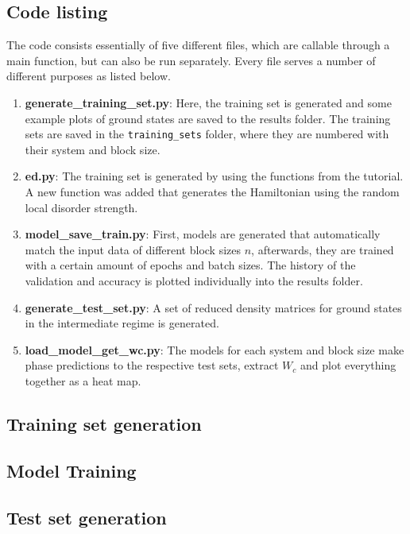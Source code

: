 \documentclass[reprint,amsmath,amssymb,aps,prb]{revtex4-2}
\begin{document}
\begin{widetext}
\section{Code listing} \label{app:codes}
The code consists essentially of five different files, which are callable through a main function, but can also be run separately. Every file serves a number of different purposes as listed below.

\begin{enumerate}
	\item \textbf{generate\_training\_set.py}: Here, the training set is generated and some example plots of ground states are saved to the results folder. The training sets are saved in the \texttt{training\_sets} folder, where they are numbered with their system and block size.
	\item \textbf{ed.py}: The training set is generated by using the functions from the tutorial. A new function was added that generates the Hamiltonian using the random local disorder strength.
	\item \textbf{model\_save\_train.py}: First, models are generated that automatically match the input data of different block sizes $n$, afterwards, they are trained with a certain amount of epochs and batch sizes. The history of the validation and accuracy is plotted individually into the results folder.
	\item \textbf{generate\_test\_set.py}: A set of reduced density matrices for ground states in the intermediate regime is generated.
	\item \textbf{load\_model\_get\_wc.py}: The models for each system and block size make phase predictions to the respective test sets, extract $W_c$ and plot everything together as a heat map.
\end{enumerate}

\subsection{Training set generation}


\subsection{Model Training}


\subsection{Test set generation}



\end{widetext}
\end{document}
